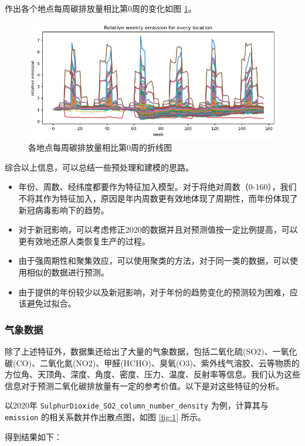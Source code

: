 \documentclass{ctexart}
\begin{document}
\begin{sloppypar}
作出各个地点每周碳排放量相比第0周的变化如图 \ref{fig:6}。

\begin{figure}[H]
      \centering
      \includegraphics[width=1\textwidth]{output6.png}
      \caption{各地点每周碳排放量相比第0周的折线图}
      \label{fig:6}
\end{figure}

综合以上信息，可以总结一些预处理和建模的思路。
\begin{itemize}
      \item 年份、周数、经纬度都要作为特征加入模型。对于将绝对周数（0-160），我们不将其作为特征加入，原因是年内周数更有效地体现了周期性，而年份体现了新冠病毒影响下的趋势。
      \item 对于新冠影响，可以考虑修正2020的数据并且对预测值按一定比例提高，可以更有效地还原人类恢复生产的过程。
      \item 由于强周期性和聚集效应，可以使用聚类的方法，对于同一类的数据，可以使用相似的数据进行预测。
      \item 由于提供的年份较少以及新冠影响，对于年份的趋势变化的预测较为困难，应该避免过拟合。
\end{itemize}

\subsubsection{气象数据}

除了上述特征外，数据集还给出了大量的气象数据，包括二氧化硫(SO2)、一氧化碳(CO)、二氧化氮(NO2)、甲醛(HCHO)、臭氧(O3)、紫外线气溶胶、云等物质的方位角、天顶角、深度、角度、密度、压力、温度、反射率等信息。我们认为这些信息对于预测二氧化碳排放量有一定的参考价值。以下是对这些特征的分析。

以2020年 \texttt{SulphurDioxide\_SO2\_column\_number\_density} 为例，计算其与 \texttt{emission} 的相关系数并作出散点图，如图 \ref{fig:1} 所示。

得到结果如下：


\end{sloppypar}
\end{document}
